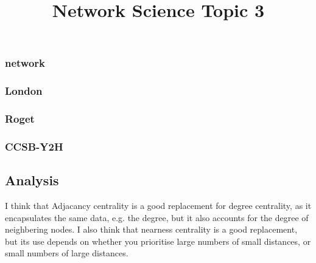 \documentclass{article}
\title{Network Science Topic 3}
\date{}
\begin{document}
\maketitle

\section{}
\subsection{}
\subsubsection{network}

\subsubsection{London}

\subsubsection{Roget}

\subsubsection{CCSB-Y2H}

\subsection{Analysis}

I think that Adjacancy centrality is a good replacement for degree centrality, as it encapsulates the same data, e.g. the degree, but it also accounts for the degree of neighbering nodes.
I also think that nearness centrality is a good replacement, but its use depends on whether you prioritise large numbers of small distances, or small numbers of large distances.
\end{document}
